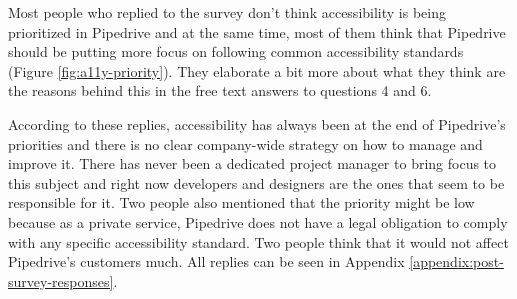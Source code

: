 \documentclass{master_thesis}
\begin{document}
Most people who replied to the survey don't think accessibility is being prioritized in Pipedrive and at the same time, most of them think that Pipedrive should be putting more focus on following common accessibility standards (Figure \ref{fig:a11y-priority}). They elaborate a bit more about what they think are the reasons behind this in the free text answers to questions 4 and 6.

According to these replies, accessibility has always been at the end of Pipedrive's priorities and there is no clear company-wide strategy on how to manage and improve it. There has never been a dedicated project manager to bring focus to this subject
and right now developers and designers are the ones that seem to be responsible for it. Two people also mentioned that the priority might be low because as a private service, Pipedrive does not have a legal obligation to comply with any specific accessibility standard. Two people think that it would not affect Pipedrive's customers much. All replies can be seen in  Appendix \ref{appendix:post-survey-responses}.
\end{document}
